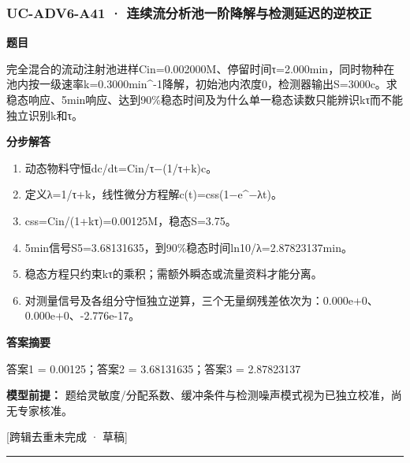 \documentclass[UTF8,11pt,a4paper]{ctexart}
\begin{document}
\subsubsection*{UC-ADV6-A41 · 连续流分析池一阶降解与检测延迟的逆校正}
\noindent\textbf{题目}\par
完全混合的流动注射池进样Cin=0.002000M、停留时间τ=2.000min，同时物种在池内按一级速率k=0.3000min\textasciicircum{}-1降解，初始池内浓度0，检测器输出S=3000c。求稳态响应、5min响应、达到90\%稳态时间及为什么单一稳态读数只能辨识kτ而不能独立识别k和τ。\par
\medskip\noindent\textbf{分步解答}
\begin{enumerate}
\item 动态物料守恒dc/dt=Cin/τ−(1/τ+k)c。
\item 定义λ=1/τ+k，线性微分方程解c(t)=css(1−e\textasciicircum{}−λt)。
\item css=Cin/(1+kτ)=0.00125M，稳态S=3.75。
\item 5min信号S5=3.68131635，到90\%稳态时间ln10/λ=2.87823137min。
\item 稳态方程只约束kτ的乘积；需额外瞬态或流量资料才能分离。
\item 对测量信号及各组分守恒独立逆算，三个无量纲残差依次为：0.000e+0、0.000e+0、-2.776e-17。
\end{enumerate}
\noindent\textbf{答案摘要}\par
答案1 = 0.00125；答案2 = 3.68131635；答案3 = 2.87823137\par
\noindent\textbf{模型前提：}
题给灵敏度/分配系数、缓冲条件与检测噪声模式视为已独立校准，尚无专家核准。\par
\noindent\textcolor{red!65!black}{[跨辑去重未完成 · 草稿]} \par
\medskip\hrule\medskip
{}
\end{document}
